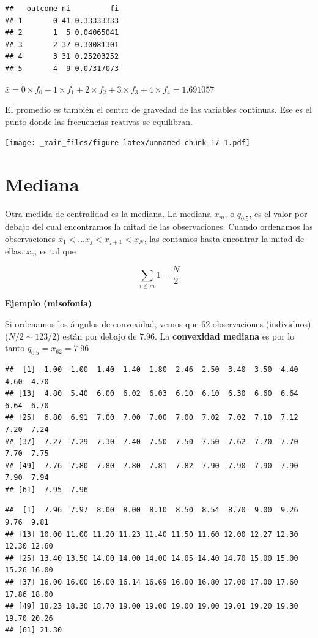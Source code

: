 \documentclass[
]{book}
\begin{document}
\begin{verbatim}
##   outcome ni         fi
## 1       0 41 0.33333333
## 2       1  5 0.04065041
## 3       2 37 0.30081301
## 4       3 31 0.25203252
## 5       4  9 0.07317073
\end{verbatim}

\(\bar{x}=0\times f_{0}+1\times f_{1}+2\times f_{2}+3\times f_{3}+4\times f_{4}=1.691057\)

El promedio es también el centro de gravedad de las variables continuas. Ese es el punto donde las frecuencias reativas se equilibran.

\texttt{[image: \_main\_files/figure-latex/unnamed-chunk-17-1.pdf]}

\hypertarget{mediana}{%
\section{Mediana}\label{mediana}}

Otra medida de centralidad es la mediana. La mediana \(x_m\), o \(q_{0.5}\), es el valor por debajo del cual encontramos la mitad de las observaciones. Cuando ordenamos las observaciones \(x_1 <... x_j < x_{j+1} < x_N\), las contamos hasta encontrar la mitad de ellas. \(x_m\) es tal que

\[\sum_{i\leq m} 1 = \frac{N}{2}\]

\textbf{Ejemplo (misofonía)}

Si ordenamos los ángulos de convexidad, vemos que \(62\) observaciones (individuos) (\(N/2 \sim 123/2\)) están por debajo de \(7.96\). La \textbf{convexidad mediana} es por lo tanto \(q_{0.5}=x_{62}=7.96\)

\begin{verbatim}
##  [1] -1.00 -1.00  1.40  1.40  1.80  2.46  2.50  3.40  3.50  4.40  4.60  4.70
## [13]  4.80  5.40  6.00  6.02  6.03  6.10  6.10  6.30  6.60  6.64  6.64  6.70
## [25]  6.80  6.91  7.00  7.00  7.00  7.00  7.02  7.02  7.10  7.12  7.20  7.24
## [37]  7.27  7.29  7.30  7.40  7.50  7.50  7.50  7.62  7.70  7.70  7.70  7.75
## [49]  7.76  7.80  7.80  7.80  7.81  7.82  7.90  7.90  7.90  7.90  7.90  7.94
## [61]  7.95  7.96
\end{verbatim}

\begin{verbatim}
##  [1]  7.96  7.97  8.00  8.00  8.10  8.50  8.54  8.70  9.00  9.26  9.76  9.81
## [13] 10.00 11.00 11.20 11.23 11.40 11.50 11.60 12.00 12.27 12.30 12.30 12.60
## [25] 13.40 13.50 14.00 14.00 14.00 14.05 14.40 14.70 15.00 15.00 15.26 16.00
## [37] 16.00 16.00 16.00 16.14 16.69 16.80 16.80 17.00 17.00 17.60 17.86 18.00
## [49] 18.23 18.30 18.70 19.00 19.00 19.00 19.00 19.01 19.20 19.30 19.70 20.26
## [61] 21.30
\end{verbatim}
\end{document}
